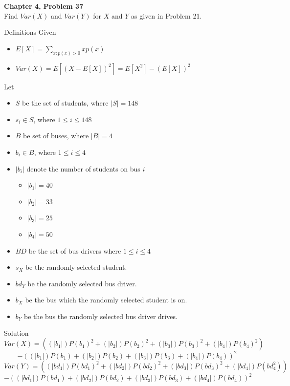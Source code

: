 \documentclass{article}
\begin{document}
\begin{spacing}{1.1}
\newpage
\begin{homeworkProblem}
  {\bf Chapter 4, Problem 37}\\
  Find $Var( X)$ and $Var( Y)$ for $X$ and $Y$ as given in Problem 21.
  \begin{homeworkSection}{Definitions}
    Given
      \begin{itemize}
        \item $E[ X] = \sum\limits_{x:p( x) > 0}{ x p( x)}$
        \item $Var( X) = E[ (X - E[ X])^2] = E[ X^2] - (E[ X])^2$
      \end{itemize}
    Let
      \begin{itemize}
        \item $S$ be the set of students, where $|S| = 148$
        \item $s_i \in S$, where $1 \le i \le 148$
        \item $B$ be set of buses, where $|B| = 4$
        \item $b_i \in B$, where $1 \le i \le 4$
        \item $|b_i|$ denote the number of students on bus $i$
          \begin{itemize}
            \item $|b_1| = 40$
            \item $|b_2| = 33$
            \item $|b_3| = 25$
            \item $|b_4| = 50$
          \end{itemize}
        \item $BD$ be the set of bus drivers where $1 \le i \le 4$
        \item $s_X$ be the randomly selected student.
        \item $bd_Y$ be the randomly selected bus driver.
        \item $b_X$ be the bus which the randomly selected student is on.
        \item $b_Y$ be the bus the randomly selected bus driver drives.
      \end{itemize}
  \end{homeworkSection}
  \begin{homeworkSection}{Solution}
    \[Var( X) =  \left((|b_1|) P( b_1)^2 + (|b_2|) P( b_2)^2 + (|b_3|) P( b_3)^2 + (|b_4|) P( b_4)^2\right)\]
        \[- \left((|b_1|) P( b_1) + (|b_2|) P( b_2) + (|b_3|) P( b_3) + (|b_4|) P( b_4)\right)^2\]
    \[Var( Y) = \left((|bd_1|) P( bd_1)^2 + (|bd_2|) P( bd_2)^2 + (|bd_3|) P( bd_3)^2 + (|bd_4|) P( bd_4^2)\right)\]
       \[- \left((|bd_1|) P( bd_1) + (|bd_2|) P( bd_2) + (|bd_3|) P( bd_3) + (|bd_4|) P( bd_4)\right)^2\]
  \end{homeworkSection}
\end{homeworkProblem}


\end{spacing}
\end{document}
